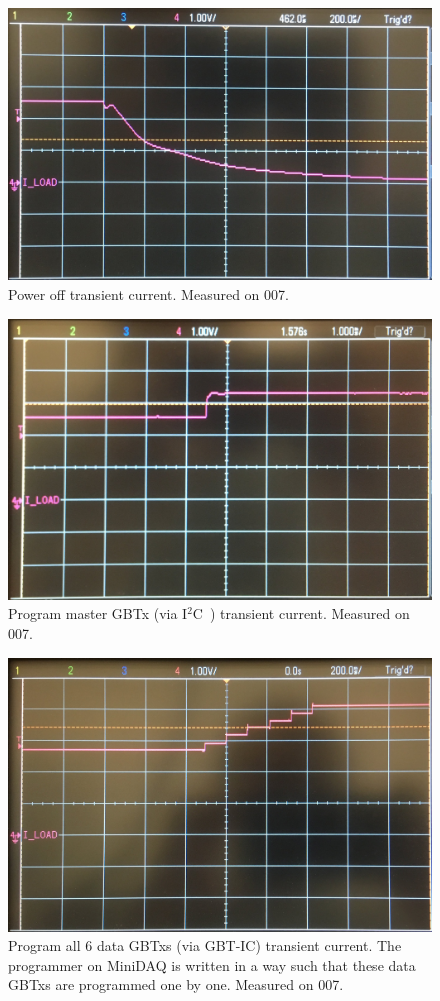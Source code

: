 \documentclass[11pt,letterpaper]{refart}
\def\itwoc{I{$\scriptstyle^2$}C\ }
\begin{document}
\begin{figure}[ht]
    \centering
    \includegraphics[width=0.8\linewidth]{./res/current_transient/power_off.jpg}
    \caption[Power off transient current]{
        Power off transient current. Measured on 007.
    }
\end{figure}

\begin{figure}[ht]
    \centering
    \includegraphics[width=0.8\linewidth]
        {./res/current_transient/program_master.jpg}
    \caption[Program master GBTx transient current]{
        Program master GBTx (via \itwoc) transient current.
        Measured on 007.
    }
\end{figure}

\begin{figure}[ht]
    \centering
    \includegraphics[width=0.8\linewidth]
        {./res/current_transient/program_data.jpg}
    \caption[Program data GBTxs transient current]{
        Program all 6 data GBTxs (via GBT-IC) transient current.
        The programmer on MiniDAQ is written in a way such that these data GBTxs
        are programmed one by one.
        Measured on 007.
    }
\end{figure}
\end{document}
